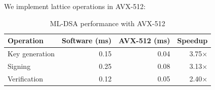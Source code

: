 We implement lattice operations in AVX-512:

\begin{table}[h]
\centering
\begin{tabular}{lrrr}
\toprule
\textbf{Operation} & \textbf{Software (ms)} & \textbf{AVX-512 (ms)} & \textbf{Speedup} \\
\midrule
Key generation & 0.15 & 0.04 & 3.75$\times$ \\
Signing & 0.25 & 0.08 & 3.13$\times$ \\
Verification & 0.12 & 0.05 & 2.40$\times$ \\
\bottomrule
\end{tabular}
\caption{ML-DSA performance with AVX-512}
\end{table}

